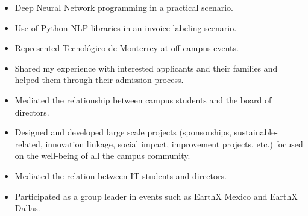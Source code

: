\documentclass[10pt,a4paper,ragged2e]{altacv}
\begin{document}

\begin{fullwidth}
\makecvheader
\end{fullwidth}



\begin{itemize}
\item Deep Neural Network programming in a practical scenario.
\item Use of Python NLP libraries in an invoice labeling scenario.
\end{itemize}

\begin{itemize}
\item Represented Tecnológico de Monterrey at off-campus events.
\item Shared my experience with interested applicants and their families and helped them through their admission process.
\end{itemize}
\divider

\begin{itemize}
\item Mediated the relationship between campus students and the board of directors.
\item Designed and developed large scale projects (sponsorships, sustainable-related, innovation linkage, social impact, improvement projects, etc.) focused on the well-being of all the campus community.
\end{itemize}

\begin{itemize}
\item Mediated the relation between IT students and directors.
\item Participated as a group leader in events such as EarthX Mexico and EarthX Dallas.
\end{itemize}
\divider
\end{document}
